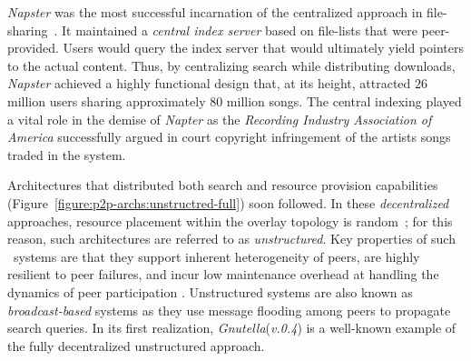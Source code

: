 {\sl Napster} was the most successful incarnation of the
centralized approach in file-sharing~\cite{napster}.
It maintained a \emph{central index server} based on file-lists 
that were peer-provided.
Users would query the index server that would ultimately 
yield pointers to the actual content.
Thus, by centralizing search while distributing downloads,  {\sl Napster}
achieved a highly functional design that, at its height, attracted $26$ million
users sharing approximately $80$ million songs\cite{jmm_naptopusage_2001}.
The central indexing played a vital role in the demise of 
{\sl Napter} as the \emph{Recording
Industry Association of America} successfully argued in court 
copyright infringement of the artists songs traded in the system. 
%

Architectures that distributed both search and resource provision 
capabilities (Figure~\ref{figure:p2p-archs:unstructred-full}) soon followed.
In these \emph{decentralized} approaches, 
resource placement within the overlay topology is random~\cite{YG-M2002};
for this reason, such architectures are referred to as \emph{unstructured}. 
Key properties  of such \p\ systems are that they
support inherent heterogeneity of peers, 
are highly resilient to peer failures,
and incur low maintenance overhead at handling 
the dynamics of peer participation \cite{stutzbach_churn_2006}. 
Unstructured systems are also known as 
\emph{broadcast-based} systems as they use message flooding among
peers to propagate search queries. 
In its first realization,
{\sl Gnutella}(\emph{v.0.4}) is a well-known example of the fully
decentralized unstructured approach.

